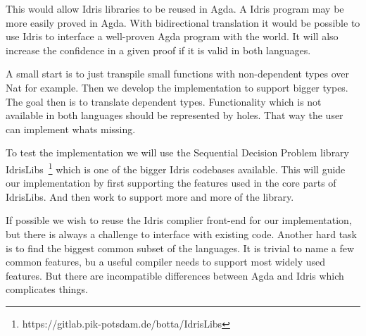 \documentclass{scrartcl}
\begin{document}
This would allow Idris libraries to be reused in Agda. A Idris program may be
more easily proved in Agda. With bidirectional translation it would be possible
to use Idris to interface a well-proven Agda program with the world.  It will
also increase the confidence in a given proof if it is valid in both languages.

A small start is to just transpile small functions with non-dependent types
over Nat for example. Then we develop the implementation to support bigger
types. The goal then is to translate dependent types.  Functionality which is
not available in both languages should be represented by holes. That way the
user can implement whats missing.

To test the implementation we will use the Sequential Decision Problem library
IdrisLibs~\footnote{https://gitlab.pik-potsdam.de/botta/IdrisLibs} which is one
of the bigger Idris codebases available. This will guide our implementation by
first supporting the features used in the core parts of IdrisLibs. And then
work to support more and more of the library.

If possible we wish to reuse the Idris complier front-end for our
implementation, but there is always a challenge to interface with existing
code.  Another hard task is to find the biggest common subset of the languages.
It is trivial to name a few common features, bu a useful compiler needs to
support most widely used features. But there are incompatible differences
between Agda and Idris which complicates things.











\end{document}
